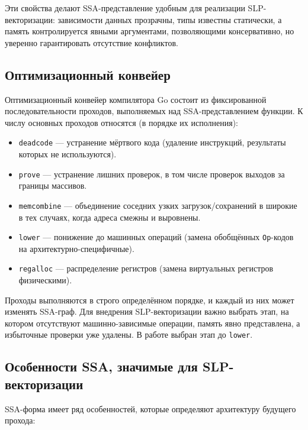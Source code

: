 Эти свойства делают SSA-представление удобным для реализации SLP-векторизации: 
зависимости данных прозрачны, типы известны статически, а память контролируется явными аргументами, позволяющими консервативно,
но уверенно гарантировать отсутствие конфликтов.

\subsection{Оптимизационный конвейер}
\label{sec:go_opt_pipeline}

Оптимизационный конвейер компилятора Go состоит из фиксированной последовательности проходов,
выполняемых над SSA-представлением функции. 
К числу основных проходов относятся (в порядке их исполнения):

\begin{itemize}
    \item \texttt{deadcode} --- устранение мёртвого кода (удаление инструкций, результаты которых не используются).
    \item \texttt{prove} --- устранение лишних проверок, в том числе проверок выходов за границы массивов.
    \item \texttt{memcombine} --- объединение соседних узких загрузок/сохранений в широкие в тех случаях, когда адреса смежны и выровнены.
    \item \texttt{lower} --- понижение до машинных операций (замена обобщённых \texttt{Op}-кодов на архитектурно-специфичные).
    \item \texttt{regalloc} --- распределение регистров (замена виртуальных регистров физическими).
\end{itemize}

Проходы выполняются в строго определённом порядке, и каждый из них может изменять SSA-граф. 
Для внедрения SLP-векторизации важно выбрать этап, на котором отсутствуют машинно-зависимые операции, память явно представлена, 
а избыточные проверки уже удалены. В работе выбран этап до \texttt{lower}.

\subsection{Особенности SSA, значимые для SLP-векторизации}
\label{sec:ssa_slp_features}

SSA-форма имеет ряд особенностей, которые определяют архитектуру будущего прохода:

